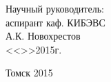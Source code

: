 \vfill

\begin{flushright}
\begin{minipage}{0.45\textwidth}
 \begin{flushleft}
  Научный руководитель: \\
  аспирант каф. КИБЭВС \\
  \underline{\hspace{3cm}}А.К. Новохрестов \\
  <<\underline{\hspace{1cm}}>>\underline{\hspace{3cm}}2015г.\\
 \end{flushleft}
\end{minipage}
\end{flushright}

\vfill

\begin{center}
 Томск 2015
\end{center}

